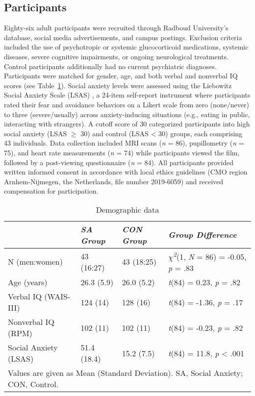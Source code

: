 \subsection{Participants}
Eighty-six adult participants were recruited through Radboud University's database, social media advertisements, and campus postings. Exclusion criteria included the use of psychotropic or systemic glucocorticoid medications, systemic diseases, severe cognitive impairments, or ongoing neurological treatments. Control participants additionally had no current psychiatric diagnoses. Participants were matched for gender, age, and both verbal and nonverbal IQ scores \citep{raven1989,wechsler1997} (see Table~\ref{tab:ppt-stats-sa}). Social anxiety levels were assessed using the Liebowitz Social Anxiety Scale (LSAS) \citep{liebowitz1987,oakman2003}, a 24-item self-report instrument where participants rated their fear and avoidance behaviors on a Likert scale from zero (none/never) to three (severe/usually) across anxiety-inducing situations (e.g., eating in public, interacting with strangers). A cutoff score of 30 \citep{rytwinski2009} categorized participants into high social anxiety (LSAS $\geq$ 30) and control (LSAS < 30) groups, each comprising 43 individuals. Data collection included MRI scans (\textit{n} = 86), pupillometry (\textit{n} = 75), and heart rate measurements (\textit{n} = 74) while participants viewed the film, followed by a post-viewing questionnaire (\textit{n} = 84). All participants provided written informed consent in accordance with local ethics guidelines (CMO region Arnhem-Nijmegen, the Netherlands, file number 2019-6059) and received compensation for participation.

\begin{table}[ht]
    \captionsetup{justification=raggedright, singlelinecheck=false, font = normal} %
    \setlength{\tabcolsep}{10pt} %
    \renewcommand{\arraystretch}{1.5} %
    \caption{Demographic data}
    \label{tab:ppt-stats-sa}
    \begin{tabular}{llll}
    \hline
    \textbf{} & \textit{SA Group} & \textit{CON Group} & \textit{Group Difference} \\
    \hline
    N (men:women) & 43 (16:27) & 43 (18:25) & \textit{$\chi$\textsuperscript{2}}(1, \textit{N} = 86) = -0.05, \textit{p} = .83 \\
    Age (years) & 26.3 (5.9) & 26.0 (5.2) & \textit{t}(84) = 0.23, \textit{p} = .82 \\
    Verbal IQ (WAIS-III) & 124 (14) & 128 (16) & \textit{t}(84) = -1.36, \textit{p} = .17 \\
    Nonverbal IQ (RPM) & 102 (11) & 102 (11) & \textit{t}(84) = -0.23, \textit{p} = .82 \\
    Social Anxiety (LSAS) & 51.4 (18.4) & 15.2 (7.5) & \textit{t}(84) = 11.8, \textit{p} < .001 \\
    \hline
    \multicolumn{4}{l}{\small{Values are given as Mean (Standard Deviation). SA, Social Anxiety; CON, Control.}} \\
    \end{tabular}
\end{table}

